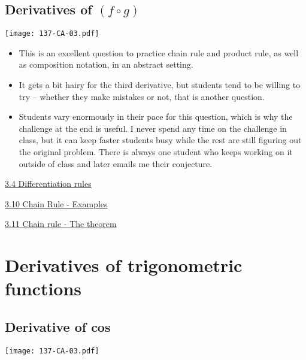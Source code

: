 \documentclass[11pt]{article}
\newcommand{\nl}{\hfill \vspace{-1.1\baselineskip}} %
\newcommand{\viv}{\hspace{8mm} \href{https://www.youtube.com/watch?v=k_VxtK1U9jk&list=PLlwePzQY_wW8qiZD6XYqCnibdY37ygbx7&index=4}{3.4 Differentiation rules}}
\newcommand{\vx}{\hspace{8mm} \href{https://www.youtube.com/watch?v=Qht28m7b13U&list=PLlwePzQY_wW8qiZD6XYqCnibdY37ygbx7&index=10}{3.10 Chain Rule - Examples}}
\newcommand{\vxi}{\hspace{8mm} \href{https://www.youtube.com/watch?v=DQiXqChpeAc&list=PLlwePzQY_wW8qiZD6XYqCnibdY37ygbx7&index=11}{3.11 Chain rule - The theorem}}
\begin{document}

\subsection{Derivatives of $(f \circ g)$} 

\begin{center}
{ \texttt{[image: 137-CA-03.pdf]}}

\end{center}


\begin{comments}
\nl
	\begin{itemize}
		\item  This is an excellent question to practice chain rule and product rule, as well as composition notation, in an abstract setting.
		\item It gets a bit hairy for the third derivative, but students tend to be willing to try -- whether they make mistakes or not, that is another question.
		\item  Students vary enormously in their pace for this question, which is why the challenge at the end is useful.  I never spend any time on the challenge in class, but it can keep faster students busy while the rest are still figuring out the original problem. There is always one student who keeps working on it outside of class and later emails me their conjecture.
	\end{itemize}
\end{comments}

\begin{videos}
\viv

\vx

\vxi
\end{videos}

\newpage

\section{Derivatives of trigonometric functions}

\subsection{Derivative of cos} 

\begin{center}
{ \texttt{[image: 137-CA-03.pdf]}}

\end{center}
\end{document}
